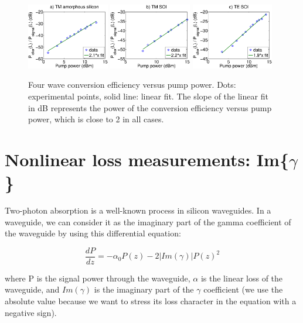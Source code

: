 \documentclass[10pt,letterpaper]{article}
\begin{document}
\begin{figure}[htb]
    \centering
    \includegraphics[width=0.32\textwidth]{fwm_differentPumps_aSitm20mm}
    \includegraphics[width=0.32\textwidth]{fwm_differentPumps_tm}
    \includegraphics[width=0.32\textwidth]{fwm_differentPumps_te}
    \caption{Four wave conversion efficiency versus pump power. Dots: experimental points, solid line: linear fit. The slope of the linear fit in dB represents the power of the conversion efficiency versus pump power, which is close to 2 in all cases.}
    \label{fig:fwmDifferentPump}
\end{figure}






\section{Nonlinear loss measurements: Im\{$ \gamma $\}}
\label{sec:imGamma}
Two-photon absorption is a well-known process in silicon waveguides. In a waveguide, we can consider it as the imaginary part of the gamma coefficient of the waveguide by using this differential equation:

\begin{equation}
 \frac{dP}{dz} = -\alpha_0 P(z) - 2|Im(\gamma)| P(z)^2 
\label{eq:differentialTPA}
\end{equation}

where P is the signal power through the waveguide, $\alpha$ is the linear loss of the waveguide, and $Im(\gamma)$ is the imaginary part of the $\gamma$ coefficient (we use the absolute value because we want to stress its loss character in the equation with a negative sign). 
\end{document}

